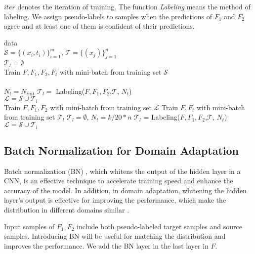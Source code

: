 \documentclass{article}
\begin{document}
\begin{algorithm}[t]
\begin{algorithmic}
 \caption{$iter$ denotes the iteration of training. The function \textit{Labeling} means the method of labeling. We assign pseudo-labels to samples when the predictions of $F_1$ and $F_2$ agree and at least one of them is confident of their predictions. \label{alg:whole}}
 data \\
$\mathcal{S} =  {\bigl\{(x_{{i}} ,{t_i})\bigr\}^{m}_{i=1}}$, $\mathcal{T} =  {\bigl\{(x_{{j}})\bigr\}^{n}_{j=1}}$\\
$\mathcal{T}_l = \emptyset$\\
\STATE Train $F, F_{1},F_2,F_{t}$ with mini-batch from training set $\mathcal{S}$\\
\ENDFOR\\
$N_t = N_{init}$
\STATE  $\mathcal{T}_l =$ Labeling($F, F_1, F_2$,$\mathcal{T}$, $N_t$)\\
$\mathcal{L} =  \mathcal{S}\cup\mathcal{T}_l$\\
\STATE Train $F,F_1,F_2$ with mini-batch from training set $\mathcal{L}$
\STATE Train $F,F_t$ with mini-batch from training set $\mathcal{T}_l$
\ENDFOR
\STATE $\mathcal{T}_{l} = \emptyset$, $N_t = k / 20 *n$
\STATE $\mathcal{T}_l$ = Labeling($F, F_1, F_2$,$\mathcal{T}$, $N_t$)
\STATE $\mathcal{L} =  \mathcal{S}\cup\mathcal{T}_l$
\ENDFOR
\end{algorithmic}
\end{algorithm}
\vspace{-3mm}
\subsection{Batch Normalization for Domain Adaptation}
Batch normalization (BN) \cite{ioffe2015batch}, which whitens the output of the hidden layer in a CNN, is an effective technique to accelerate training speed and enhance the accuracy of the model. In addition, in domain adaptation, whitening the hidden layer's output is effective for improving the performance, which make the distribution in different domains similar \cite{sun2015return,li2016revisiting}.

Input samples of $F_1,F_2$ include both pseudo-labeled target samples and source samples. Introducing BN will be useful for matching the distribution and improves the performance. We add the BN layer in the last layer in $F$.
\vspace{-3mm}
\end{document}

